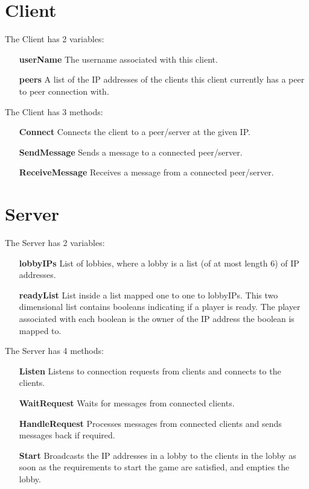 \documentclass[11pt,a4paper]{article}
\begin{document}
\section{Client}
The Client has 2 variables:
\begin{enumerate}
\item[\textbf{userName}] The username associated with this client.
\item[\textbf{peers}] A list of the IP addresses of the clients this client currently has a peer to peer connection with.
\end{enumerate}
The Client has 3 methods:
\begin{enumerate}
\item[\textbf{Connect}] Connects the client to a peer/server at the given IP.
\item[\textbf{SendMessage}] Sends a message to a connected peer/server.
\item[\textbf{ReceiveMessage}] Receives a message from a connected peer/server.
\end{enumerate}
\section{Server}
The Server has 2 variables:
\begin{enumerate}
\item[\textbf{lobbyIPs}] List of lobbies, where a lobby is a list (of at most length 6) of IP addresses. 
\item[\textbf{readyList}] List inside a list mapped one to one to lobbyIPs. This two dimensional list contains booleans indicating if a player is ready. The player associated with each boolean is the owner of the IP address the boolean is mapped to.
\end{enumerate}
The Server has 4 methods:
\begin{enumerate}
\item[\textbf{Listen}] Listens to connection requests from clients and connects to the clients.
\item[\textbf{WaitRequest}] Waits for messages from connected clients.
\item[\textbf{HandleRequest}] Processes messages from connected clients and sends messages back if required.
\item[\textbf{Start}] Broadcasts the IP addresses in a lobby to the clients in the lobby as soon as the requirements to start the game are satisfied, and empties the lobby.
\end{enumerate}
\end{document}
